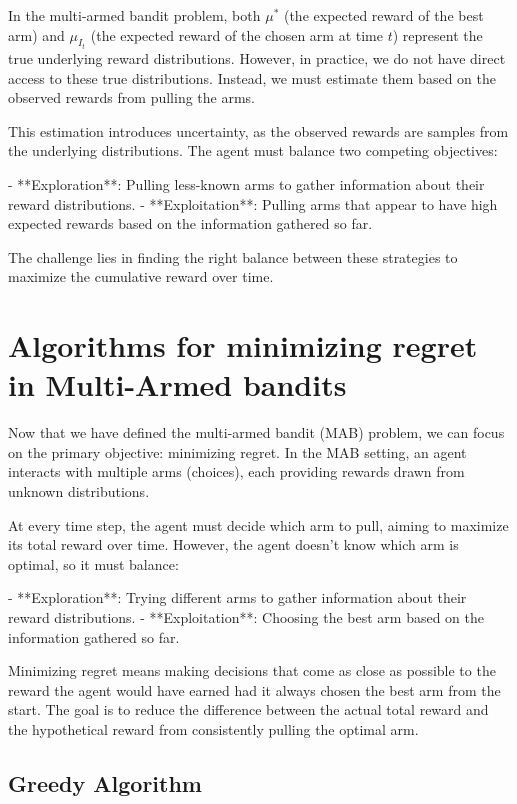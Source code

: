 \begin{warningbox}[Warning]
    In the multi-armed bandit problem, both $\mu^*$ (the expected reward of the best arm) and $\mu_{I_t}$ (the expected reward of the chosen arm at time $t$) represent the true underlying reward distributions. However, in practice, we do not have direct access to these true distributions. Instead, we must estimate them based on the observed rewards from pulling the arms.

    This estimation introduces uncertainty, as the observed rewards are samples from the underlying distributions. The agent must balance two competing objectives:

    - **Exploration**: Pulling less-known arms to gather information about their reward distributions.
    - **Exploitation**: Pulling arms that appear to have high expected rewards based on the information gathered so far.

    The challenge lies in finding the right balance between these strategies to maximize the cumulative reward over time.

\end{warningbox}

\section{Algorithms for minimizing regret in Multi-Armed bandits}

Now that we have defined the multi-armed bandit (MAB) problem, we can focus on the primary objective: minimizing regret.
In the MAB setting, an agent interacts with multiple arms (choices), each providing rewards drawn from unknown distributions.

At every time step, the agent must decide which arm to pull, aiming to maximize its total reward over time. However, the agent doesn’t know which arm is optimal, so it must balance:

- **Exploration**: Trying different arms to gather information about their reward distributions.
- **Exploitation**: Choosing the best arm based on the information gathered so far.

Minimizing regret means making decisions that come as close as possible to the reward the agent would have earned had it always chosen the best arm from the start. The goal is to reduce the difference between the actual total reward and the hypothetical reward from consistently pulling the optimal arm.

\subsection{Greedy Algorithm}

